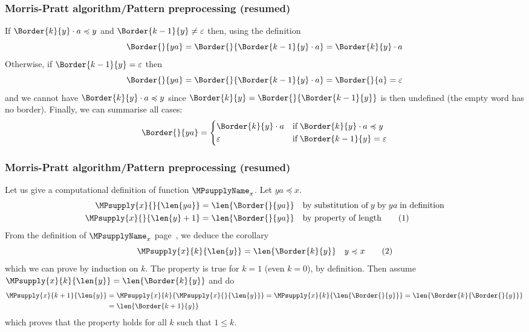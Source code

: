 %
\begin{frame}
\frametitle{Morris-Pratt algorithm/Pattern preprocessing (resumed)}

\label{border_def}

If \(\Border{k}{y} \cdot a \preccurlyeq y\) and \(\Border{k-1}{y} \neq
\varepsilon\) then, using the definition
\[
  \Border{}{ya}
= \Border{}{\Border{k-1}{y} \cdot a} 
= \Border{k}{y} \cdot a 
\]
Otherwise, if \(\Border{k-1}{y} = \varepsilon\) then
\[
  \Border{}{ya} 
= \Border{}{\Border{k-1}{y} \cdot a} 
= \Border{}{a} 
= \varepsilon
\]
and we cannot have \(\Border{k}{y} \cdot a \preccurlyeq y\) since
\(\Border{k}{y} = \Border{}{\Border{k-1}{y}}\) is then
undefined (the empty word has no border). Finally, we can summarise
all cases:
\[
\Border{}{ya} = 
\left\{
  \begin{aligned}
   & \Border{k}{y} \cdot a 
   && \text{if} \; \Border{k}{y} \cdot a \preccurlyeq y\\
   & \varepsilon 
   && \text{if} \; \Border{k-1}{y} = \varepsilon
  \end{aligned}
\right. 
\]

\end{frame}

%
\begin{frame}
\frametitle{Morris-Pratt algorithm/Pattern preprocessing (resumed)}

\label{condition}

Let us give a computational definition of function
\(\MPsupplyName_{x}\). Let \(ya \preccurlyeq x\).
\begin{align*}
   \MPsupply{x}{}{\len{ya}}  
&= \len{\Border{}{ya}}
&& \text{by substitution of} \; y \; \text{by}
                             \; ya \; \text{in definition}\\
   \MPsupply{x}{}{\len{y}+1} 
&= \len{\Border{}{ya}}
&& \text{by property of length} \tag{1}
\end{align*}
From the definition of \(\MPsupplyName_{x}\)
page~\pageref{MP_supply_def}, we deduce the corollary
\[
\MPsupply{x}{k}{\len{y}} = \len{\Border{k}{y}} \quad y \preccurlyeq x \tag{2}
\]
which we can prove by induction on \(k\). The property is true for
\(k=1\) (even \(k=0\)), by definition. Then assume
\(\MPsupply{x}{k}{\len{y}} = \len{\Border{k}{y}}\) and do
\begin{align*}
  \MPsupply{x}{k+1}{\len{y}}
&= \MPsupply{x}{k}{\MPsupply{x}{}{\len{y}}} 
= \MPsupply{x}{k}{\len{\Border{}{y}}}
= \len{\Border{k}{\Border{}{y}}}\\
&= \len{\Border{k+1}{y}}
\end{align*} 
which proves that the property holds for all \(k\) such that \( 1
\leqslant k\).

\end{frame}

